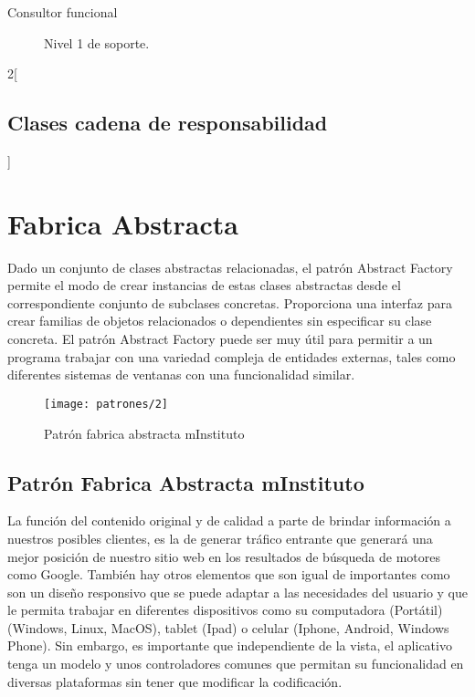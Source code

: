   \begin{description}
  	\item[Consultor funcional] Nivel 1 de soporte.
  \end{description}
  
  \begin{multicols}{2}[\subsection{Clases cadena de responsabilidad}]
    
    
    
  \end{multicols}
  
\section{Fabrica Abstracta}
Dado un conjunto de clases abstractas relacionadas, el patrón Abstract Factory permite el modo de crear instancias de estas clases abstractas desde el correspondiente conjunto de subclases concretas. Proporciona una interfaz para crear familias de objetos relacionados o dependientes sin especificar su clase concreta. El patrón Abstract Factory puede ser muy útil para permitir a un programa trabajar con una variedad compleja de entidades externas, tales como diferentes sistemas de ventanas con una funcionalidad similar. \cite{ref12}

  \begin{figure}[H]
  	\centering
  	\texttt{[image: patrones/2]}
  	\captionsetup{width=.95\textwidth}
  	\caption{Patrón fabrica abstracta mInstituto \cite{ref9,ref6}}
  	\label{patron2}
  \end{figure}
  
  \subsection{Patrón Fabrica Abstracta mInstituto}
  La función del contenido original y de calidad a parte de brindar información a nuestros posibles clientes, es la de generar tráfico entrante que generará una mejor posición de nuestro sitio web en los resultados de búsqueda de motores como Google. También hay otros elementos que son igual de importantes como son un diseño responsivo que se puede adaptar a las necesidades del usuario y que le permita trabajar en diferentes dispositivos como su computadora (Portátil) (Windows, Linux, MacOS), tablet (Ipad) o celular (Iphone, Android, Windows Phone). Sin embargo, es importante que independiente de la vista, el aplicativo tenga un modelo y unos controladores comunes que permitan su funcionalidad en diversas plataformas sin tener que modificar la codificación.
  
